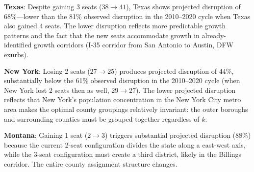 \textbf{Texas}: Despite gaining 3 seats ($38 \to 41$), Texas shows projected disruption
of 68\%---lower than the 81\% observed disruption in the 2010--2020 cycle when Texas
also gained 4 seats. The lower disruption reflects more predictable growth patterns
and the fact that the new seats accommodate growth in already-identified growth corridors
(I-35 corridor from San Antonio to Austin, DFW exurbs).

\textbf{New York}: Losing 2 seats ($27 \to 25$) produces projected disruption of 44\%,
substantially below the 61\% observed disruption in the 2010--2020 cycle (when New York
lost 2 seats then as well, $29 \to 27$). The lower projected disruption reflects that
New York's population concentration in the New York City metro area makes the optimal
county groupings relatively invariant: the outer boroughs and surrounding counties must
be grouped together regardless of $k$.

\textbf{Montana}: Gaining 1 seat ($2 \to 3$) triggers substantial projected disruption
(88\%) because the current 2-seat configuration divides the state along a
east-west axis, while the 3-seat configuration must create a third district, likely
in the Billings corridor. The entire county assignment structure changes.
